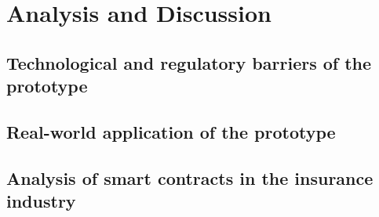 \chapter{Analysis and Discussion}\label{chapter:analysis_discussion}
\section{Technological and regulatory barriers of the prototype}\label{section:technological_regulatory_barriers}
\section{Real-world application of the prototype}\label{section:real_world_application_prototype}
\section{Analysis of smart contracts in the insurance industry}\label{section:analysis_smart_contracts_insurance}
